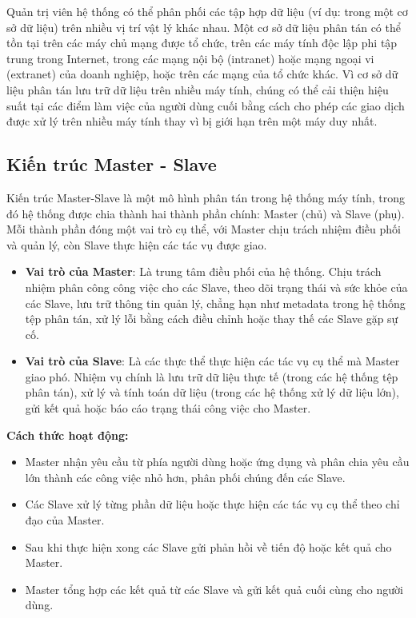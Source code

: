 \documentclass[../main.tex]{subfiles}
\begin{document}
Quản trị viên hệ thống có thể phân phối các tập hợp dữ liệu (ví dụ: trong một cơ sở dữ liệu) trên nhiều vị trí vật lý khác nhau. Một cơ sở dữ liệu phân tán có thể tồn tại trên các máy chủ mạng được tổ chức, trên các máy tính độc lập phi tập trung trong Internet, trong các mạng nội bộ (intranet) hoặc mạng ngoại vi (extranet) của doanh nghiệp, hoặc trên các mạng của tổ chức khác. Vì cơ sở dữ liệu phân tán lưu trữ dữ liệu trên nhiều máy tính, chúng có thể cải thiện hiệu suất tại các điểm làm việc của người dùng cuối bằng cách cho phép các giao dịch được xử lý trên nhiều máy tính thay vì bị giới hạn trên một máy duy nhất.

\subsection{Kiến trúc Master - Slave}
Kiến trúc Master-Slave là một mô hình phân tán trong hệ thống máy tính, trong đó hệ thống được chia thành hai thành phần chính: Master (chủ) và Slave (phụ). Mỗi thành phần đóng một vai trò cụ thể, với Master chịu trách nhiệm điều phối và quản lý, còn Slave thực hiện các tác vụ được giao.
\begin{itemize}
    \item \textbf{Vai trò của Master}: Là trung tâm điều phối của hệ thống. Chịu trách nhiệm phân công công việc cho các Slave, theo dõi trạng thái và sức khỏe của các Slave, lưu trữ thông tin quản lý, chẳng hạn như metadata trong hệ thống tệp phân tán, xử lý lỗi bằng cách điều chỉnh hoặc thay thế các Slave gặp sự cố.
    \item \textbf{Vai trò của Slave}: Là các thực thể thực hiện các tác vụ cụ thể mà Master giao phó. Nhiệm vụ chính là lưu trữ dữ liệu thực tế (trong các hệ thống tệp phân tán), xử lý và tính toán dữ liệu (trong các hệ thống xử lý dữ liệu lớn), gửi kết quả hoặc báo cáo trạng thái công việc cho Master.
\end{itemize}
 
\textbf{Cách thức hoạt động:}
\begin{itemize}
    \item Master nhận yêu cầu từ phía người dùng hoặc ứng dụng và phân chia yêu cầu lớn thành các công việc nhỏ hơn, phân phối chúng đến các Slave.
    \item Các Slave xử lý từng phần dữ liệu hoặc thực hiện các tác vụ cụ thể theo chỉ đạo của Master.
    \item Sau khi thực hiện xong các Slave gửi phản hồi về tiến độ hoặc kết quả cho Master.
    \item Master tổng hợp các kết quả từ các Slave và gửi kết quả cuối cùng cho người dùng.
\end{itemize}
\end{document}
